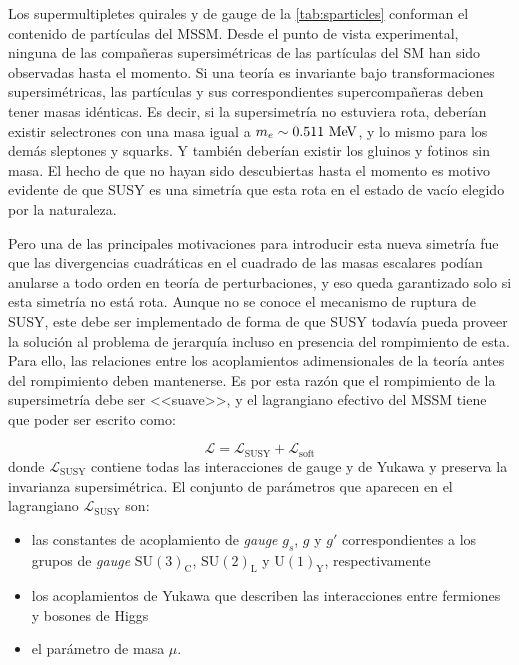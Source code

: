 Los supermultipletes quirales y de gauge de la \cref{tab:sparticles} conforman
el contenido de partículas del MSSM. Desde el punto de vista experimental,
ninguna de las compa\~neras supersimétricas de las partículas del SM han sido
observadas hasta el momento.
Si una teoría es invariante bajo transformaciones supersimétricas, las
partículas y sus correspondientes supercompa\~neras deben tener masas idénticas.
Es decir, si la supersimetría no estuviera rota, deberían
existir selectrones con una masa igual a $m_e \sim 0.511 \mev$, y lo mismo para
los demás sleptones y squarks. Y también deberían existir los gluinos y fotinos
sin masa. El hecho de que no hayan sido descubiertas hasta el momento es motivo
evidente de que SUSY es una simetría que esta rota en el estado de vacío elegido
por la naturaleza.

Pero una de las principales motivaciones para introducir esta nueva simetría fue
que las divergencias cuadráticas en el cuadrado de las masas escalares podían
anularse a todo orden en teoría de perturbaciones, y eso queda garantizado solo
si esta simetría no está rota. Aunque no se conoce el mecanismo de ruptura de
SUSY, este debe ser implementado de forma de que SUSY todavía pueda proveer la
solución al problema de jerarquía incluso en presencia del rompimiento de esta.
Para ello, las relaciones entre los acoplamientos adimensionales de la
teoría antes del rompimiento deben mantenerse. Es por esta razón que el
rompimiento de la supersimetría debe ser <<suave>>, y
el lagrangiano efectivo del MSSM tiene que poder ser escrito como:

\begin{equation}
  \mathcal{L} = \mathcal{L}_\text{SUSY} + \mathcal{L}_\text{soft}
\end{equation}
%
donde $\mathcal{L}_\text{SUSY}$ contiene todas las interacciones de gauge y de
Yukawa y preserva la invarianza supersimétrica.
El conjunto de parámetros que aparecen en el lagrangiano $\mathcal{L}_\text{SUSY}$ son:

\begin{itemize}\itemsep0.2cm\parskip0.2cm
\item las constantes de acoplamiento de \emph{gauge} $g_s$, $g$ y $g'$ correspondientes a
  los grupos de \emph{gauge} $\mathrm{SU}(3)_\mathrm{C}$, $\mathrm{SU}(2)_\mathrm{L}$ y $\mathrm{U}(1)_\mathrm{Y}$, respectivamente
\item los acoplamientos de Yukawa que describen las interacciones entre fermiones y bosones de Higgs
\item el parámetro de masa $\mu$.
\end{itemize}

